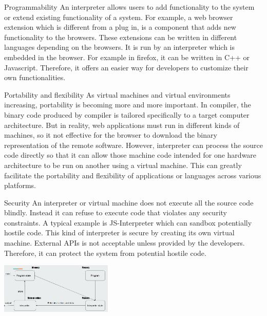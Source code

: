 \begin{nfps}
\item[Programmability] An interpreter allows users to add functionality to the
    system or extend existing functionality of a system. For example, a web
    browser extension which is different from a plug in, is a component that
    adds new functionality to the browsers. These extensions can be written in
    different languages depending on the browsers. It is run by an interpreter
    which is embedded in the browser. For example in firefox, it can be written
    in C++ or Javascript. Therefore, it offers an easier way for developers to
    customize their own functionalities.

\item[Portability and flexibility] As virtual machines and virtual
    environments increasing, portability is becoming more and more important.
    In compiler, the binary code produced by compiler is tailored specifically
    to a target computer architecture. But in reality, web applications must
    run in different kinds of machines, so it not effective for the browser to
    download the binary representation of the remote software. However,
    interpreter can process the source code directly so that it can allow those
    machine code intended for one hardware architecture to be run on another
    using a virtual machine. This can greatly facilitate the portability and
    flexibility of applications or languages across various platforms.

\item[Security] An interpreter or virtual machine does not execute all the
    source code blindly. Instead it can refuse to execute code that violates
    any security constraints. A typical example is JS-Interpreter which can
    sandbox potentially hostile code. This kind of interpreter is secure by
    creating its own virtual machine. External APIs is not acceptable unless
    provided by the developers. Therefore, it can protect the system from
    potential hostile code.

\end{nfps}

\begin{center}
    \includegraphics[width=0.4\textwidth]{./interpreter}
\end{center}

